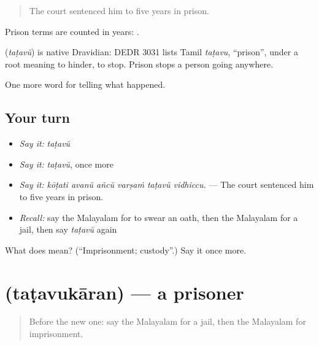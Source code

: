 \begin{quote}
The court sentenced him to five years in prison.
\end{quote}

Prison terms are counted in years:   .

\begin{cousinweb}
\textbf{} (\emph{taṭavŭ}) is native Dravidian: DEDR 3031 lists Tamil \emph{taṭavu}, \textquotedblleft{}prison\textquotedblright{}, under a root meaning to hinder, to stop. Prison stops a person going anywhere.
\end{cousinweb}

\begin{grammarlens}[title={What you've built}]
One more word for telling what happened.
\end{grammarlens}

\subsection*{Your turn}
\begin{itemize}
\raggedright
  \item \emph{Say it:} \emph{taṭavŭ}
  \item \emph{Say it:} \emph{taṭavŭ}, once more
  \item \emph{Say it:} \emph{kōṭati avanŭ añcŭ varṣaṁ taṭavŭ vidhiccu.} — The court sentenced him to five years in prison.
  \item \emph{Recall:} say the Malayalam for to swear an oath, then the Malayalam for a jail, then say \emph{taṭavŭ} again
\end{itemize}

\begin{tcolorbox}[breakable,colback=teal!4,colframe=teal!35!black,title={Before you move on}]
What does  mean? (\textquotedblleft{}Imprisonment; custody\textquotedblright{}.) Say it once more.
\end{tcolorbox}
\section[\texorpdfstring{\ml{തടവുകാരൻ} (taṭavukāran)}{തടവുകാരൻ (taṭavukāran)}]{ (taṭavukāran) — a prisoner}

\label{lesson:ML-C371-tatavukaran}



\begin{quote}
Before the new one: say the Malayalam for a jail, then the Malayalam for imprisonment.
\end{quote}


